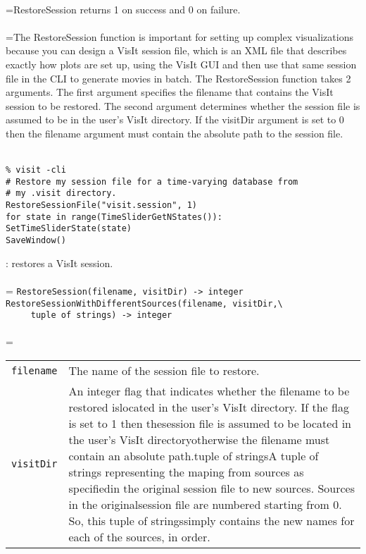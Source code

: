 \documentclass[10pt,a4paper]{report}
\begin{document}
 \\ 
\hangindent=\parindent RestoreSession returns 1 on success and 0 on failure. \\[-3mm] 

 \\ 
\hangindent=\parindent The RestoreSession function is important for setting up complex visualizations because you can design a VisIt session file, which is an XML file that describes exactly how plots are set up, using the VisIt GUI and then use that same session file in the CLI to generate movies in batch. The RestoreSession function takes 2 arguments. The first argument specifies the filename that contains the VisIt session to be restored. The second argument determines whether the session file is assumed to be in the user's VisIt directory. If the visitDir argument is set to 0 then the filename argument must contain the absolute path to the session file. \\[-3mm] 

\\[-6mm]
\begin{verbatim}% visit -cli
# Restore my session file for a time-varying database from 
# my .visit directory.
RestoreSessionFile("visit.session", 1)
for state in range(TimeSliderGetNStates()):
SetTimeSliderState(state)
SaveWindow()
\end{verbatim}
\newpage


{}
: restores a VisIt session.\\[-3mm]

 \\ 
\hangindent=\parindent 
\verb!RestoreSession(filename, visitDir) -> integer!\\
\verb!RestoreSessionWithDifferentSources(filename, visitDir,\ ! \\ 
\verb!     tuple of strings) -> integer!\\ [-3mm]

 \\ 
\hangindent=\parindent 
\begin{tabular}{lp{9cm}}
\verb!filename! & The name of the session file to restore. \\
\verb!visitDir! & An integer flag that indicates whether the filename to be restored islocated in the user's VisIt directory. If the flag is set to 1 then thesession file is assumed to be located in the user's VisIt directoryotherwise the filename must contain an absolute path.tuple of stringsA tuple of strings representing the maping from sources as specifiedin the original session file to new sources. Sources in the originalsession file are numbered starting from 0. So, this tuple of stringssimply contains the new names for each of the sources, in order. \\
\end{tabular} \\[-2mm]
\end{document}
